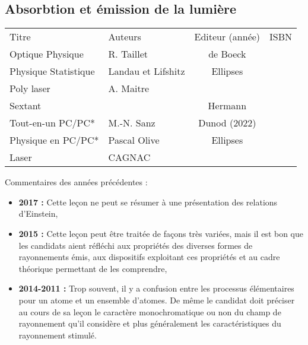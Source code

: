 \begin{headerBlock}
  \chapter{Absorbtion et émission de la lumière}
    \label{LP_Absorption}
\end{headerBlock}

\begin{center}
\begin{tabularx}{\textwidth}{| X | X | c | c |}
  \hline
  \rowcolor{gray!20}\multicolumn{4}{c}{Bibliographie de la leçon : } \\
  \hline 
  Titre & Auteurs & Editeur (année) & ISBN \\
  \hline
  Optique Physique & R. Taillet & de Boeck &   \\
  \hline 
  Physique Statistique & Landau et Lifshitz & Ellipses &  \\
 \hline 
   Poly laser & A. Maitre &  &  \\
 \hline
  Sextant & & Hermann & \\
 \hline 
 Tout-en-un PC/PC* & M.-N. Sanz & Dunod (2022) & \\
 \hline 
 Physique en PC/PC* & Pascal Olive & Ellipses & \\
 \hline
 Laser & CAGNAC & & \\
 \hline
\end{tabularx}
\end{center}

\begin{reportBlock}{Commentaires des années précédentes :}
    \begin{itemize}
        \item \textbf{2017 :} Cette leçon ne peut se résumer à une présentation des relations d’Einstein,
        \item \textbf{2015 :} Cette leçon peut être traitée de façons très variées, mais il est bon que les candidats aient réfléchi aux propriétés des diverses formes de rayonnements émis, aux dispositifs exploitant ces propriétés et au cadre théorique permettant de les comprendre,
        \item \textbf{2014-2011 : }Trop souvent, il y a confusion entre les processus élémentaires pour un atome et un ensemble d’atomes. De même le candidat doit préciser au cours de sa leçon le caractère monochromatique ou non du champ de rayonnement qu’il considère et plus généralement les caractéristiques du rayonnement stimulé.
    \end{itemize}
\end{reportBlock}

